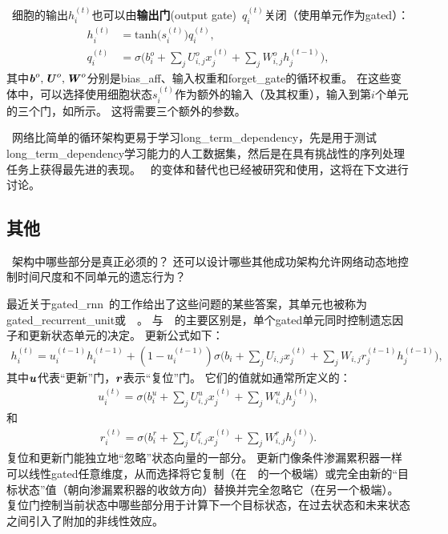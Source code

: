 ~细胞的输出$h_i^{(t)}$也可以由\textbf{输出门}(output gate)~$q_i^{(t)}$关闭（使用单元作为\gls{gated}）：
\begin{align}
 h_i^{(t)} &= \text{tanh}\big( s_i^{(t)} \big) q_i^{(t)}, \\
 q_i^{(t)} &= \sigma \Big( b_i^o + \sum_j U_{i,j}^o x_j^{(t)} + \sum_j W_{i,j}^o h_j^{(t-1)} \Big),
\end{align}
其中$\boldsymbol{\mathit{b}}^o, \boldsymbol{\mathit{U}}^o, \boldsymbol{\mathit{W}}^o$分别是\gls{bias_aff}、输入权重和\gls{forget_gate}的循环权重。
在这些变体中，可以选择使用细胞状态$s_i^{(t)}$作为额外的输入（及其权重），输入到第$i$个单元的三个门，如所示。
这将需要三个额外的参数。


~网络比简单的循环架构更易于学习\gls{long_term_dependency}，先是用于测试\gls{long_term_dependency}学习能力的人工数据集\citep{Bengio-trnn94,Hochreiter+Schmidhuber-1997,chapter-gradient-flow-2001}，然后是在具有挑战性的序列处理任务上获得最先进的表现\citep{Graves-book2012,Graves-arxiv2013,Sutskever-et-al-NIPS2014}。
~的变体和替代也已经被研究和使用，这将在下文进行讨论。

\subsection{其他}
\label{sec:other_gated_rnns}
~架构中哪些部分是真正必须的？
还可以设计哪些其他成功架构允许网络动态地控制时间尺度和不同单元的遗忘行为？

最近关于\gls{gated_rnn}~的工作给出了这些问题的某些答案，其单元也被称为\gls{gated_recurrent_unit}或~~\citep{cho-al-arxiv14-ssst8,Chung-et-al-NIPSDL2014-small,chung-icml15-gated,Jozefowicz-et-al-ICML2015,Chrupala-et-al-arxiv2015}。
与~~的主要区别是，单个\gls{gated}单元同时控制遗忘因子和更新状态单元的决定。
更新公式如下：
\begin{align}
 h_i^{(t)} = u_i^{(t-1)} h_i^{(t-1)} + (1 - u_i^{(t-1)}) \sigma 
 \Big( b_i + \sum_j U_{i,j} x_j^{(t)} + \sum_j W_{i,j} r_j^{(t-1)} h_j^{(t-1)} \Big),
\end{align}
其中$\boldsymbol{\mathit{u}}$代表``更新''门，$\boldsymbol{\mathit{r}}$表示``复位''门。
它们的值就如通常所定义的：
\begin{align}
 u_i^{(t)} = \sigma \Big( b_i^u + \sum_j U_{i,j}^u x_j^{(t)} + \sum_j W_{i,j}^u h_j^{(t)} \Big),
\end{align}
和
\begin{align}
 r_i^{(t)} = \sigma \Big( b_i^r + \sum_j U_{i,j}^r x_j^{(t)} + \sum_j W_{i,j}^r h_j^{(t)} \Big).
\end{align}
复位和更新门能独立地``忽略''状态向量的一部分。
更新门像条件渗漏累积器一样可以线性\gls{gated}任意维度，从而选择将它复制（在~~的一个极端）或完全由新的``目标状态''值（朝向渗漏累积器的收敛方向）替换并完全忽略它（在另一个极端）。
复位门控制当前状态中哪些部分用于计算下一个目标状态，在过去状态和未来状态之间引入了附加的非线性效应。

